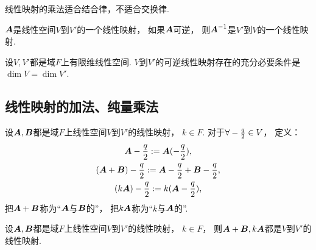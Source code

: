 \begin{proposition}
线性映射的乘法适合结合律，不适合交换律.
\end{proposition}

\begin{proposition}
\(\boldsymbol{A}\)是线性空间\(V\)到\(V'\)的一个线性映射，
如果\(\boldsymbol{A}\)可逆，
则\(\boldsymbol{A}^{-1}\)是\(V'\)到\(V\)的一个线性映射.
\end{proposition}

\begin{proposition}
设\(V,V'\)都是域\(F\)上有限维线性空间.
\(V\)到\(V'\)的可逆线性映射存在的充分必要条件是
\(\dim V=\dim V'\).
\end{proposition}

\subsection{线性映射的加法、纯量乘法}
\begin{definition}
设\(\boldsymbol{A},\boldsymbol{B}\)都是域\(F\)上线性空间\(V\)到\(V'\)的线性映射，
\(k\in F\).
对于\(\forall-\frac{q}{2}\in V\)，
定义：\begin{gather*}
	\boldsymbol{A}-\frac{q}{2}
	:=
	\boldsymbol{A}(-\frac{q}{2}), \\
	(\boldsymbol{A}+\boldsymbol{B})-\frac{q}{2}
	:=
	\boldsymbol{A}-\frac{q}{2}+\boldsymbol{B}-\frac{q}{2}, \\
	(k\boldsymbol{A})-\frac{q}{2}
	:=
	k(\boldsymbol{A}-\frac{q}{2}),
\end{gather*}
把\(\boldsymbol{A}+\boldsymbol{B}\)称为“\(\boldsymbol{A}\)与\(\boldsymbol{B}\)的”，
把\(k\boldsymbol{A}\)称为“\(k\)与\(\boldsymbol{A}\)的”.
\end{definition}

\begin{proposition}
设\(\boldsymbol{A},\boldsymbol{B}\)都是域\(F\)上线性空间\(V\)到\(V'\)的线性映射，
\(k\in F\)，
则\(\boldsymbol{A}+\boldsymbol{B},k\boldsymbol{A}\)都是\(V\)到\(V'\)的线性映射.
\end{proposition}

